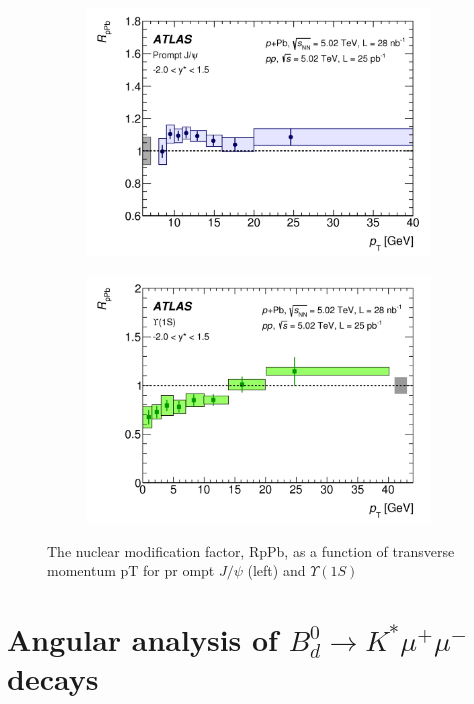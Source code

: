 \documentclass[epj]{webofc}
\begin{document}
\begin{figure}
    \centering
    \begin{subfigure}[H]{0.45\textwidth}
        \includegraphics[width=\textwidth]{plots/production/fig_10a.png}
    \end{subfigure}
    \begin{subfigure}[H]{0.45\textwidth}
        \includegraphics[width=\textwidth]{plots/production/fig_12a.png}
    \end{subfigure}
    \caption{The nuclear modification factor, RpPb, as a function of transverse momentum pT for pr    ompt $J/\psi$ (left) and $\Upsilon (1S)$} 
    \label{fig:production}
\end{figure}

\section {Angular analysis of $B^0_d \rightarrow K^{*}\mu^+\mu^-$ decays}
\end{document}
